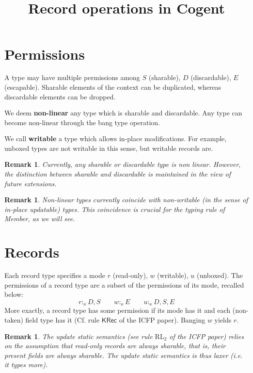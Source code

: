 \documentclass{article}
\title{Record operations in Cogent}
\newtheorem{remark}[theorem]{Remark}
\begin{document}
\maketitle

\section{Permissions}
A type may have multiple permissions among $S$ (sharable), $D$ (discardable), $E$ (escapable).
Sharable elements of the context can be duplicated, whereas discardable
elements can be dropped.

We deem \textbf{non-linear} any type which is sharable and discardable.
Any type can become non-linear through the bang type operation. 

We call \textbf{writable} a type which allows in-place modifications. For
example, unboxed types are not writable in this sense, but writable records are.

\begin{remark}
\label{r:S-D-non-lin}  
  Currently, any sharable or discardable type is non linear.
  However, the distinction between sharable and discardable is maintained in the view of future extensions.
\end{remark}
\begin{remark}
 \label{r:S-D-non-writable} Non-linear types currently coincide with non-writable (in the
 sense of in-place updatable) types. This coincidence is crucial for the typing rule of
 Member, as we will see.
\end{remark}


\section{Records}
Each record type specifies a mode $r$ (read-only), $w$ (writable), $u$ (unboxed).
The permissions of a record type are a subset of the permissions of its mode,
recalled below:
\[
  r:_\kappa {D,S}\qquad
  w:_\kappa {E}\qquad
  u:_\kappa {D,S,E}
\]
More exactly, a record type has some permission if its mode has it and each
(non-taken) field type has it (Cf. rule $\mathsf{KRec}$ of the ICFP paper).
Banging $w$ yields $r$.

\begin{remark}
 The update static semantics (see rule $\text{RL}_2$ of the ICFP paper) relies on the
 assumption that read-only records are always sharable, that is, their present
 fields are always sharable. The update static semantics is thus laxer (i.e. it
 types more).
\end{remark}
\end{document}
